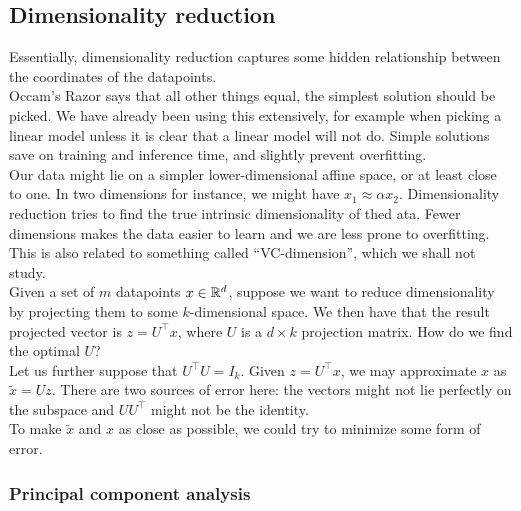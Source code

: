 \documentclass{article}
\begin{document}
	\subsection{Dimensionality reduction}

		Essentially, dimensionality reduction captures some hidden relationship between the coordinates of the datapoints.\\

		Occam's Razor says that all other things equal, the simplest solution should be picked. We have already been using this extensively, for example when picking a linear model unless it is clear that a linear model will not do. Simple solutions save on training and inference time, and slightly prevent overfitting.\\
		Our data might lie on a simpler lower-dimensional affine space, or at least close to one. In two dimensions for instance, we might have $x_1 \approx \alpha x_2$. Dimensionality reduction tries to find the true intrinsic dimensionality of thed ata. Fewer dimensions makes the data easier to learn and we are less prone to overfitting.\\
		This is also related to something called ``VC-dimension'', which we shall not study.\\

		Given a set of $m$ datapoints $x\in\mathbb{R}^d$, suppose we want to reduce dimensionality by projecting them to some $k$-dimensional space. We then have that the result projected vector is $z = U^\top x$, where $U$ is a $d\times k$ projection matrix. How do we find the optimal $U$?\\
		Let us further suppose that $U^\top U = I_k$. Given $z = U^\top x$, we may approximate $x$ as $\tilde{x} = U z$. There are two sources of error here: the vectors might not lie perfectly on the subspace and $UU^\top$ might not be the identity.\\
		To make $\tilde{x}$ and $x$ as close as possible, we could try to minimize some form of error.

		\subsubsection{Principal component analysis}
\end{document}
